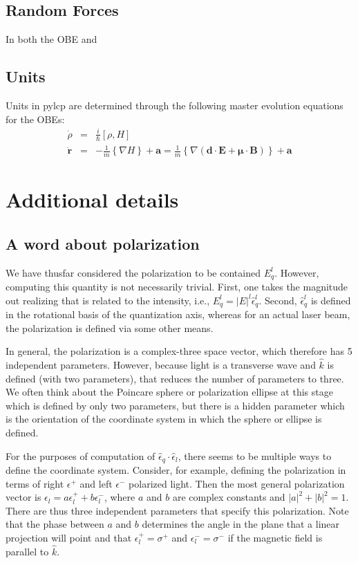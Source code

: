 \documentclass[final,5p,times,twocolumn]{elsarticle}
\newcounter{bla}
\begin{document}
\subsection{Random Forces}
In both the OBE and

\subsection{Units}
Units in pylcp are determined through the following master evolution equations
for the OBEs:
\begin{eqnarray}
    \dot{\rho} & = & \frac{i}{\hbar}[\rho, H] \\
    \ddot{\mathbf{r}} & = & -\frac{1}{m} \left\{\nabla H\right\} + \mathbf{a} = \frac{1}{m}\left\{\nabla (\mathbf{d} \cdot \mathbf{E} + \mathbf{\mu}\cdot \mathbf{B})\right\} + \mathbf{a}
\end{eqnarray}

\section{Additional details}

\subsection{A word about polarization}
We have thusfar considered the polarization to be contained $E^l_q$.  However,
computing this quantity is not necessarily trivial.  First, one takes the
magnitude out realizing that is related to the intensity, i.e., $E^l_q =
|E|^l\hat{\epsilon}^l_q$.  Second, $\hat{\epsilon}^l_q$ is defined in the
rotational basis of the quantization axis, whereas for an actual laser beam,
the polarization is defined via some other means.

In general, the polarization is a complex-three space vector, which therefore
has 5 independent parameters.  However, because light is a transverse wave and
$\hat{k}$ is defined (with two parameters), that reduces the number of
parameters to three.  We often think about the Poincare sphere or polarization
ellipse at this stage which is defined by only two parameters, but there is a
hidden parameter which is the orientation of the coordinate system in which
the sphere or ellipse is defined.

For the purposes of computation of $\hat{\epsilon}_q\cdot\hat{\epsilon}_l$,
there seems to be multiple ways to define the coordinate system.  Consider, for
example, defining the polarization in terms of right $\epsilon^+$ and left
$\epsilon^-$ polarized light.  Then the most general polarization vector is
$\epsilon_l = a \epsilon^+_l + b \epsilon^-_l$, where $a$ and $b$ are complex
constants and $|a|^2+|b|^2=1$.  There are thus three independent parameters that
specify this polarization.  Note that the phase between $a$ and $b$ determines
the angle in the plane that a linear projection will point and that
$\epsilon^+_l=\sigma^+$ and $\epsilon^-_l=\sigma^-$ if the magnetic field is
parallel to $\hat{k}$.
\end{document}
